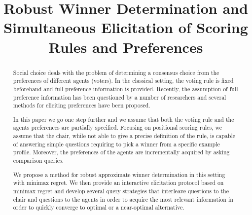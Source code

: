 \newrelation{\pinc}{\!\parallel\!}%

\newcommand{\profile}{\bm{v}}%
\newcommand{\pprofile}{{\bm{p}}}%
\newcommand{\w}{\bm{w}}
\newcommand{\W}{\mathcal{W}}
\newcommand{\Co}{\mathcal{C}}
\newcommand{\pw}{W}%
\newcommand{\powersetz}[1]{\mathscr{P}^*(#1)}

\DeclareMathOperator{\Regret}{Regret}
\DeclareMathOperator{\SCORE}{Score}
\DeclareMathOperator{\PMR}{PMR}
\DeclareMathOperator{\MR}{MR}
\DeclareMathOperator{\MMR}{MMR}
\DeclareMathOperator*{\argmax}{argmax}
\DeclareMathOperator*{\argmin}{argmin}

\newtheorem{claim}{Claim}
\newtheorem{prop}{Proposition}
\newtheorem{corollary}{Corollary}
\newtheorem{definition}{Definition}
\newtheorem{example}{Example}

\DeclarePairedDelimiter\set{\{}{\}}
\DeclarePairedDelimiter\card{\lvert}{\rvert}

	\hfuzz=1cm

\title{Robust Winner Determination and Simultaneous Elicitation of Scoring Rules and Preferences}


\maketitle
\begin{abstract}
Social choice deals with the problem of determining a consensus choice from the preferences of different agents (voters).
In the classical setting, the voting rule is fixed beforehand and full preference information is provided.
Recently, the assumption of full preference information has been questioned by a number of researchers and several methods for eliciting preferences have been proposed.

In this paper we go one step further and we assume that both the voting rule and the agents preferences are partially specified.
Focusing on positional scoring rules, we assume that the chair, while  not able to give a precise definition of the rule, is capable of answering simple questions  requiring to pick a winner from a specific  example profile.
Moreover, the preferences of the agents are incrementally acquired by asking comparison queries.

We propose a method  for robust approximate winner determination in this setting with minimax regret. 
We then provide an interactive elicitation protocol based on minimax regret
and develop several query strategies that interleave questions to the chair and questions to the agents in order to acquire the most relevant information in order to quickly converge to optimal or a near-optimal alternative.
\end{abstract}

